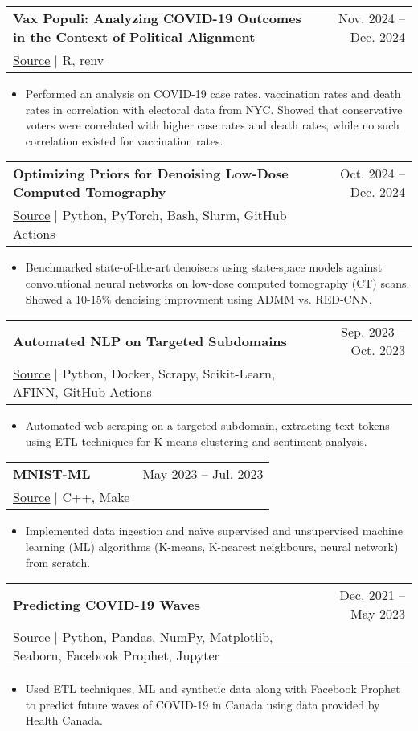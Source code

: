 \documentclass[letterpaper,11pt]{article}
\makeatletter
\newcommand{\resumeItem}[1]{
  \item\small{
    {#1 \vspace{-2pt}}
  }
}
\newcommand{\resumeProjectHeading}[4]{ %
    \item
    \begin{tabular*}{0.97\textwidth}{l@{\extracolsep{\fill}}r}
      \small\textbf{#1} & #2 \\
    \small\href{#3}{{\footnotesize\faGithub} \underline{Source}} $|$ #4 & \\ %
    \end{tabular*}\vspace{-7pt}
}
\newcommand{\resumeItemListStart}{\begin{itemize}}
\newcommand{\resumeItemListEnd}{\end{itemize}\vspace{-5pt}}
\makeatother
\begin{document}
        \resumeProjectHeading
          {Vax Populi: Analyzing COVID-19 Outcomes in the Context of Political Alignment}
          {Nov. 2024 -- Dec. 2024}
          {https://github.com/john-s-lin/vax-populi} %
          {R, renv} %
          \resumeItemListStart
            \resumeItem{Performed an analysis on COVID-19 case rates, vaccination rates and death rates in correlation with electoral data from NYC. Showed that conservative voters were correlated with higher case rates and death rates, while no such correlation existed for vaccination rates.}
          \resumeItemListEnd
          
        \resumeProjectHeading
          {Optimizing Priors for Denoising Low-Dose Computed Tomography}
          {Oct. 2024 -- Dec. 2024}
          {https://github.com/john-s-lin/mambagym} %
          {Python, PyTorch, Bash, Slurm, GitHub Actions} %
          \resumeItemListStart
            \resumeItem{Benchmarked state-of-the-art denoisers using state-space models against convolutional neural networks on low-dose computed tomography (CT) scans. Showed a 10-15\% denoising improvment using ADMM vs. RED-CNN.}
          \resumeItemListEnd

      \resumeProjectHeading
          {Automated NLP on Targeted Subdomains}
          {Sep. 2023 -- Oct. 2023}
          {https://github.com/john-s-lin/nonsense-sentiment-scraper} %
          {Python, Docker, Scrapy, Scikit-Learn, AFINN, GitHub Actions} %
          \resumeItemListStart
            \resumeItem{Automated web scraping on a targeted subdomain, extracting text tokens using ETL techniques for K-means clustering and sentiment analysis.}
          \resumeItemListEnd

      \resumeProjectHeading
          {MNIST-ML}
          {May 2023 -- Jul. 2023}
          {https://github.com/john-s-lin/mnist-ml} %
          {C++, Make} %
          \resumeItemListStart
            \resumeItem{Implemented data ingestion and naïve supervised and unsupervised machine learning (ML) algorithms (K-means, K-nearest neighbours, neural network) from scratch.}
          \resumeItemListEnd

      \resumeProjectHeading
          {Predicting COVID-19 Waves}
          {Dec. 2021 -- May 2023}
          {https://github.com/john-s-lin/can-covid-wave} %
          {Python, Pandas, NumPy, Matplotlib, Seaborn, Facebook Prophet, Jupyter} %
          \resumeItemListStart
            \resumeItem{Used ETL techniques, ML and synthetic data along with Facebook Prophet to predict future waves of COVID-19 in Canada using data provided by Health Canada.}
          \resumeItemListEnd
\end{document}
